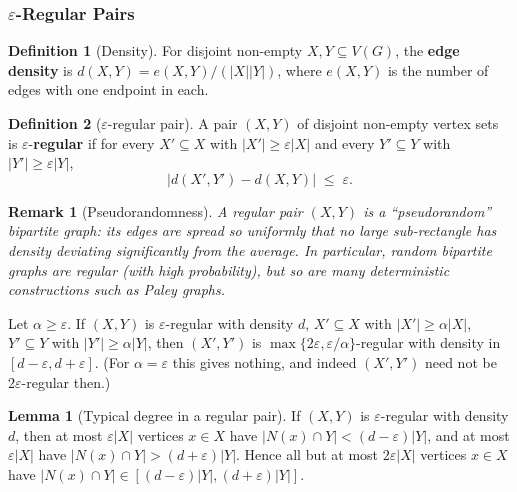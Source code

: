 \documentclass{article}
\newtheorem{remark}{Remark}
\theoremstyle{definition}
\newtheorem{lemma}{Lemma}
\newtheorem{definition}{Definition}
\begin{document}
\subsubsection{$\varepsilon$-Regular Pairs}

\begin{definition}[Density]
For disjoint non-empty $X, Y \subseteq V(G)$, the \textbf{edge density}
is $d(X, Y) = e(X, Y)/(|X||Y|)$, where $e(X, Y)$ is the number of
edges with one endpoint in each.
\end{definition}

\begin{definition}[$\varepsilon$-regular pair]\label{def:regular-pair}
A pair $(X, Y)$ of disjoint non-empty vertex sets is
$\varepsilon$-\textbf{regular} if for every $X' \subseteq X$ with
$|X'| \ge \varepsilon|X|$ and every $Y' \subseteq Y$ with
$|Y'| \ge \varepsilon|Y|$,
\[
  |d(X', Y') - d(X, Y)| \;\le\; \varepsilon.
\]
\end{definition}

\begin{remark}[Pseudorandomness]
A regular pair $(X, Y)$ is a ``pseudorandom'' bipartite graph: its
edges are spread so uniformly that no large sub-rectangle has density
deviating significantly from the average. In particular, random
bipartite graphs are regular (with high probability), but so are many
deterministic constructions such as Paley graphs.
\end{remark}

\begin{proposition}[Sliceability]
Let $\alpha \ge \varepsilon$. If $(X, Y)$ is $\varepsilon$-regular with density
$d$, $X' \subseteq X$ with $|X'| \ge \alpha |X|$, $Y' \subseteq Y$ with
$|Y'| \ge \alpha |Y|$, then $(X', Y')$ is
$\max\{2\varepsilon, \varepsilon/\alpha\}$-regular with density in
$[d - \varepsilon, d + \varepsilon]$. (For $\alpha = \varepsilon$ this gives
nothing, and indeed $(X', Y')$ need not be $2\varepsilon$-regular then.)
\end{proposition}

\begin{lemma}[Typical degree in a regular pair]\label{lem:regulartypical}
If $(X, Y)$ is $\varepsilon$-regular with density $d$, then at most
$\varepsilon|X|$ vertices $x \in X$ have $|N(x) \cap Y| < (d - \varepsilon)|Y|$,
and at most $\varepsilon|X|$ have $|N(x) \cap Y| > (d + \varepsilon)|Y|$. Hence all
but at most $2\varepsilon|X|$ vertices $x \in X$ have
$|N(x) \cap Y| \in [(d - \varepsilon)|Y|, (d + \varepsilon)|Y|]$.
\end{lemma}
\end{document}
